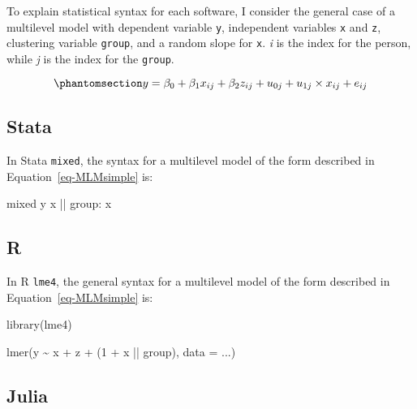 \documentclass[
  letterpaper,
  DIV=11,
  numbers=noendperiod]{scrreprt}
\newenvironment{Shaded}{\begin{snugshade}}{\end{snugshade}}
\newcommand{\AttributeTok}[1]{\textcolor[rgb]{0.40,0.45,0.13}{#1}}
\newcommand{\DecValTok}[1]{\textcolor[rgb]{0.68,0.00,0.00}{#1}}
\newcommand{\FunctionTok}[1]{\textcolor[rgb]{0.28,0.35,0.67}{#1}}
\newcommand{\NormalTok}[1]{\textcolor[rgb]{0.00,0.23,0.31}{#1}}
\newcommand{\SpecialCharTok}[1]{\textcolor[rgb]{0.37,0.37,0.37}{#1}}
\begin{document}
To explain statistical syntax for each software, I consider the general
case of a multilevel model with dependent variable \texttt{y},
independent variables \texttt{x} and \texttt{z}, clustering variable
\texttt{group}, and a random slope for \texttt{x}. \emph{i} is the index
for the person, while \emph{j} is the index for the \texttt{group}.

\begin{equation}\phantomsection\label{eq-MLMsimple}{y = \beta_0 + \beta_1 x_{ij} + \beta_2 z_{ij} + u_{0j} + u_{1j} \times x_{ij} + e_{ij}}\end{equation}

\subsection{Stata}

In Stata \texttt{mixed}, the syntax for a multilevel model of the form
described in Equation~\ref{eq-MLMsimple} is:

\begin{Shaded}
\begin{Highlighting}[]
\NormalTok{mixed }\FunctionTok{y}\NormalTok{ x || }\FunctionTok{group}\NormalTok{: x}
\end{Highlighting}
\end{Shaded}

\subsection{R}

In R \texttt{lme4}, the general syntax for a multilevel model of the
form described in Equation~\ref{eq-MLMsimple} is:

\begin{Shaded}
\begin{Highlighting}[]
\FunctionTok{library}\NormalTok{(lme4)}

\FunctionTok{lmer}\NormalTok{(y }\SpecialCharTok{\textasciitilde{}}\NormalTok{ x }\SpecialCharTok{+}\NormalTok{ z }\SpecialCharTok{+}\NormalTok{ (}\DecValTok{1} \SpecialCharTok{+}\NormalTok{ x }\SpecialCharTok{||}\NormalTok{ group), }\AttributeTok{data =}\NormalTok{ ...)}
\end{Highlighting}
\end{Shaded}

\subsection{Julia}
\end{document}
